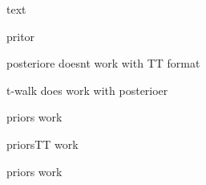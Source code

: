 \begin{figure}[h]
	\centering
	\scalebox{0.66}{}
	\caption[]{text}
	\label{fig:Results}
\end{figure}



\begin{figure}[h]
	\centering
	\scalebox{0.66}{}
	\caption[]{pritor}
	\label{fig:Results}
\end{figure}

\begin{figure}[h]
	\centering
	\scalebox{0.66}{}
	\caption[]{posteriore doesnt work with TT format}
	\label{fig:Results}
\end{figure}


\begin{figure}[h]
	\centering
	\scalebox{0.66}{}
	\caption[]{t-walk does work with posterioer}
	\label{fig:Results}
\end{figure}




\begin{figure}[h]
	\centering
	\scalebox{1}{}
	\caption[]{priors work}
	\label{fig:Results}
\end{figure}


\begin{figure}[h]
	\centering
	\scalebox{1}{}
	\caption[]{priorsTT work}
	\label{fig:Results}
\end{figure}


\begin{figure}[h]
	\centering
	\scalebox{1}{}
	\caption[]{priors work}
	\label{fig:Results}
\end{figure}


